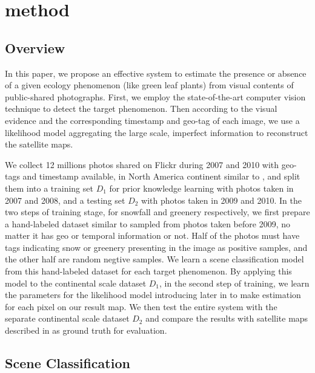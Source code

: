 \section{method}

\subsection{Overview}
In this paper, we propose an effective system to estimate the presence or absence 
of a given ecology phenomenon (like green leaf plants) 
from visual contents of public-shared photographs. First, we employ the state-of-the-art 
computer vision technique to detect the target phenomenon. Then according to the visual evidence 
and the corresponding timestamp and geo-tag of each image, we use a likelihood model 
aggregating the large scale, imperfect information to reconstruct the satellite maps.

We collect 12 millions photos shared on Flickr during 2007 and 2010 with geo-tags and timestamp available, 
in North America continent similar to , and split them into a training set $D_1$ for prior knowledge 
learning with photos taken in 2007 and 2008, and a testing set $D_2$ with photos taken in 2009 and 2010.
In the two steps of training stage, for snowfall and greenery respectively, we first 
prepare a hand-labeled dataset similar to 
 sampled from photos taken 
before 2009, no matter it has geo or temporal 
information or not. Half of the photos must have tags indicating snow or greenery presenting 
in the image as positive samples, and the other half are random negtive samples. 
We learn a scene classification model from this hand-labeled dataset for each target phenomenon. By  
applying this model to the continental scale dataset $D_1$, in the second step 
of training, we learn the parameters for the likelihood model introducing later 
in  to 
make estimation for each pixel on our result map. We then test the entire system with the separate continental 
scale dataset $D_2$ and compare the results with satellite maps described in  as ground 
truth for evaluation.

\subsection{Scene Classification}
